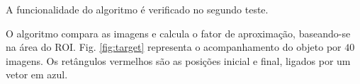 A funcionalidade do algoritmo é verificado no segundo teste.

O algoritmo compara as imagens e calcula o fator de aproximação, 
baseando-se na área do ROI. Fig. \ref{fig:target} representa o 
acompanhamento do objeto por $40$ imagens. Os retângulos vermelhos
são as posições inicial e final, ligados por um vetor em azul.

